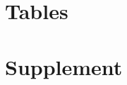 \documentclass[11pt]{baderart}
\begin{document}
\clearpage
\section{Tables}






\clearpage
\section{Supplement}


\end{document}

